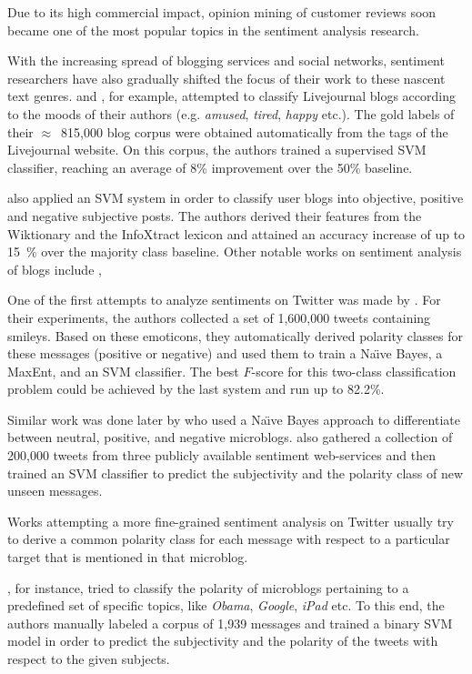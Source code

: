 Due to its high commercial impact, opinion mining of customer reviews
soon became one of the most popular topics in the sentiment analysis
research. \cite{Dave:03}

With the increasing spread of blogging services and social networks,
sentiment researchers have also gradually shifted the focus of their
work to these nascent text genres. \citet{Mishne:05} and
\citet{Mishne:07}, for example, attempted to classify Livejournal
blogs according to the moods of their authors (e.g.  \emph{amused},
\emph{tired}, \emph{happy} etc.).  The gold labels of their
$\approx$~815,000 blog corpus were obtained automatically from the
tags of the Livejournal website.  On this corpus, the authors trained
a supervised SVM classifier, reaching an average of 8\% improvement
over the 50\% baseline.

\citet{Chesley:06} also applied an SVM system in order to classify
user blogs into objective, positive and negative subjective posts.
The authors derived their features from the Wiktionary and the
InfoXtract lexicon \citep{Srihari:03} and attained an accuracy
increase of up to 15~\% over the majority class baseline.  Other
notable works on sentiment analysis of blogs include
\citet{Godbole:07}, \citet{Gill:08}


One of the first attempts to analyze sentiments on Twitter was made by
\citet{Go:09}.  For their experiments, the authors collected a set of
1,600,000 tweets containing smileys.  Based on these emoticons, they
automatically derived polarity classes for these messages (positive or
negative) and used them to train a Na\"{\i}ve Bayes, a MaxEnt, and an
SVM classifier.  The best $F$-score for this two-class classification
problem could be achieved by the last system and run up to 82.2\%.

Similar work was done later by \citet{Pak:10} who used a Na\"{\i}ve
Bayes approach to differentiate between neutral, positive, and
negative microblogs. \citet{Barbosa:10} also gathered a collection of
200,000 tweets from three publicly available sentiment web-services
and then trained an SVM classifier to predict the subjectivity and the
polarity class of new unseen messages.

Works attempting a more fine-grained sentiment analysis on Twitter
usually try to derive a common polarity class for each message with
respect to a particular target that is mentioned in that microblog.

\citet{Jiang:11}, for instance, tried to classify the polarity of
microblogs pertaining to a predefined set of specific topics, like
\emph{Obama}, \emph{Google}, \emph{iPad} etc.  To this end, the
authors manually labeled a corpus of 1,939 messages and trained a
binary SVM model in order to predict the subjectivity and the polarity
of the tweets with respect to the given subjects.

